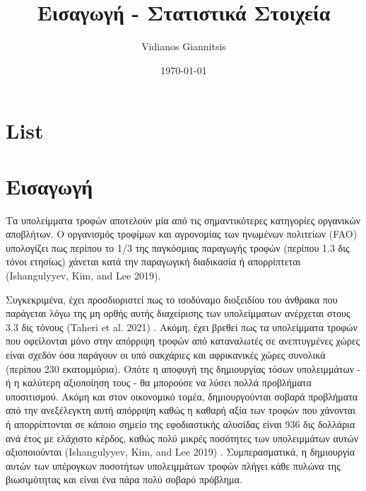 \documentclass[11pt]{article}
\author{Vidianos Giannitsis}
\date{\today}
\title{Εισαγωγή - Στατιστικά Στοιχεία}
\begin{document}
\maketitle
\tableofcontents


\section{List}
\label{sec:orgf164e19}
\listoffigures

\section{Εισαγωγή}
\label{sec:org15c371b}
Τα υπολείμματα τροφών αποτελούν μία από τις σημαντικότερες κατηγορίες οργανικών αποβλήτων. Ο οργανισμός τροφίμων και αγρονομίας των ηνωμένων πολιτείων (FAO) υπολογίζει πως περίπου το 1/3 της παγκόσμιας παραγωγής τροφών (περίπου 1.3 δις τόνοι ετησίως) χάνεται κατά την παραγωγική διαδικασία ή απορρίπτεται (Ishangulyyev, Kim, and Lee 2019).

Συγκεκριμένα, έχει προσδιοριστεί πως το ισοδύναμο διοξειδίου του άνθρακα που παράγεται λόγω της μη ορθής αυτής διαχείρισης των υπολείμματων ανέρχεται στους 3.3 δις τόνους (Taheri et al. 2021) . Ακόμη, έχει βρεθεί πως τα υπολείμματα τροφών που οφείλονται μόνο στην απόρριψη τροφών από καταναλωτές σε ανεπτυγμένες χώρες είναι σχεδόν όσα παράγουν οι υπό σακχάριες και αφρικανικές χώρες συνολικά (περίπου 230 εκατομμύρια). Οπότε η αποφυγή της δημιουργίας τόσων υπολειμμάτων - ή η καλύτερη αξιοποίηση τους - θα μπορούσε να λύσει πολλά προβλήματα υποσιτισμού. Ακόμη και στον οικονομικό τομέα, δημιουργούνται σοβαρά προβλήματα από την ανεξέλεγκτη αυτή απόρριψη καθώς η καθαρή αξία των τροφών που χάνονται ή απορρίπτονται σε κάποιο σημείο της εφοδιαστικής αλυσίδας είναι 936 δις δολλάρια ανά έτος με ελάχιστο κέρδος, καθώς πολύ μικρές ποσότητες των υπολειμμάτων αυτών αξιοποιούνται (Ishangulyyev, Kim, and Lee 2019) . Συμπερασματικά, η δημιουργία αυτών των υπέρογκων ποσοτήτων υπολειμμάτων τροφών πλήγει κάθε πυλώνα της βιωσιμότητας και είναι ένα πάρα πολύ σοβαρό πρόβλημα.
\end{document}
